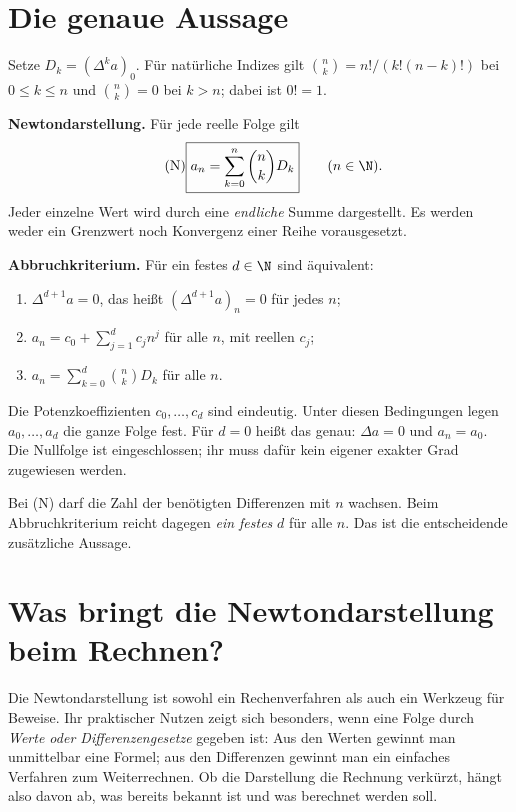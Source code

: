 \section{Die genaue Aussage}

Setze $D_k=(\Delta^ka)_0$. Für natürliche Indizes gilt
$\binom nk=n!/(k!(n-k)!)$ bei $0\leq k\leq n$ und
$\binom nk=0$ bei $k>n$; dabei ist $0!=1$.

\textbf{Newtondarstellung.} Für jede reelle Folge gilt
\begin{equation}\tag{N}\label{newton:identity}
 \boxed{\displaystyle a_n=\sum_{k=0}^{n}\binom nk D_k}
 \qquad(n\in\N).
\end{equation}
Jeder einzelne Wert wird durch eine \emph{endliche} Summe dargestellt.
Es werden weder ein Grenzwert noch Konvergenz einer Reihe vorausgesetzt.

\textbf{Abbruchkriterium.} Für ein festes $d\in\N$ sind äquivalent:
\begin{enumerate}
\item $\Delta^{d+1}a=0$, das heißt $(\Delta^{d+1}a)_n=0$ für jedes $n$;
\item $a_n=c_0+\sum_{j=1}^d c_jn^j$ für alle $n$, mit reellen $c_j$;
\item $a_n=\sum_{k=0}^d\binom nkD_k$ für alle $n$.
\end{enumerate}
Die Potenzkoeffizienten $c_0,\ldots,c_d$ sind eindeutig.
Unter diesen Bedingungen legen $a_0,\ldots,a_d$ die ganze Folge fest.
Für $d=0$ heißt das genau: $\Delta a=0$ und $a_n=a_0$.
Die Nullfolge ist eingeschlossen; ihr muss dafür kein eigener exakter
Grad zugewiesen werden.

Bei (N) darf die Zahl der benötigten Differenzen mit $n$ wachsen.
Beim Abbruchkriterium reicht dagegen \emph{ein festes} $d$ für alle $n$.
Das ist die entscheidende zusätzliche Aussage.

\section{Was bringt die Newtondarstellung beim Rechnen?}
\label{newton:practical}

Die Newtondarstellung ist sowohl ein Rechenverfahren als auch ein
Werkzeug für Beweise. Ihr praktischer Nutzen zeigt sich besonders,
wenn eine Folge durch \emph{Werte oder Differenzengesetze} gegeben ist:
Aus den Werten gewinnt man unmittelbar eine Formel; aus den
Differenzen gewinnt man ein einfaches Verfahren zum Weiterrechnen.
Ob die Darstellung die Rechnung verkürzt, hängt also davon ab, was
bereits bekannt ist und was berechnet werden soll.

